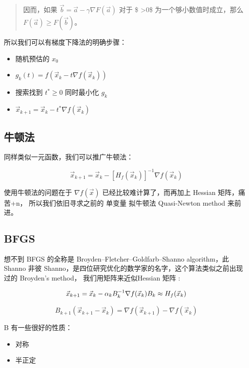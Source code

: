\documentclass[
]{book}
\providecommand{\tightlist}{%
  \setlength{\itemsep}{0pt}\setlength{\parskip}{0pt}}
\begin{document}
\begin{quote}
因而，如果 \({\vec {b}}={\vec {a}}-\gamma \nabla F({\vec {a}})\) 对于 \$ \gamma \textgreater0\$ 为一个够小数值时成立，那么 \(F({\vec {a}})\geq F({\vec {b}})\)。
\end{quote}

所以我们可以有梯度下降法的明确步骤：

\begin{itemize}
\tightlist
\item
  随机预估的 \(x_0\)
\item
  \(g_k(t) = f(\vec{x}_k - t \nabla f(\vec{x}_k))\)
\item
  搜索找到 \(t^* \ge 0\) 同时最小化 \(g_k\)
\item
  \(\vec{x}_{k+1} = \vec{x}_k - t^* \nabla f(\vec{x}_k)\)
\end{itemize}

\hypertarget{ux725bux987fux6cd5-2}{%
\subsection{牛顿法}\label{ux725bux987fux6cd5-2}}

同样类似一元函数，我们可以推广牛顿法：

\[\vec{x}_{k+1} = \vec{x}_k - [H_f(\vec{x}_k)]^{-1} \nabla f(\vec{x}_k)\]

使用牛顿法的问题在于 \(\nabla f(\vec{x})\) 已经比较难计算了，而再加上 Hessian 矩阵，痛苦+n， 所以我们依旧寻求之前的 单变量 拟牛顿法 Quasi-Newton method 来前进。

\hypertarget{bfgs}{%
\subsection{BFGS}\label{bfgs}}

想不到 BFGS 的全称是 Broyden--Fletcher--Goldfarb--Shanno algorithm，此 Shanno 非彼 Shanno，是四位研究优化的数学家的名字，这个算法类似之前出现过的 Broyden's method， 我们用矩阵来近似Hessian 矩阵 :

\[
\vec{x}_{k+1} = \vec{x}_k - \alpha_k B_{k}^{-1}\nabla f(\vec{x}_k) \\
B_k \approx H_f(\vec{x}_k)
\]

\[
B_{k+1} ( \vec{x}_{k+1} - \vec{x}_k)  =  \nabla f(\vec{x}_{k+1}) - \nabla f(\vec{x}_{k}) 
\]

B 有一些很好的性质：

\begin{itemize}
\tightlist
\item
  对称
\item
  半正定
\end{itemize}
\end{document}
